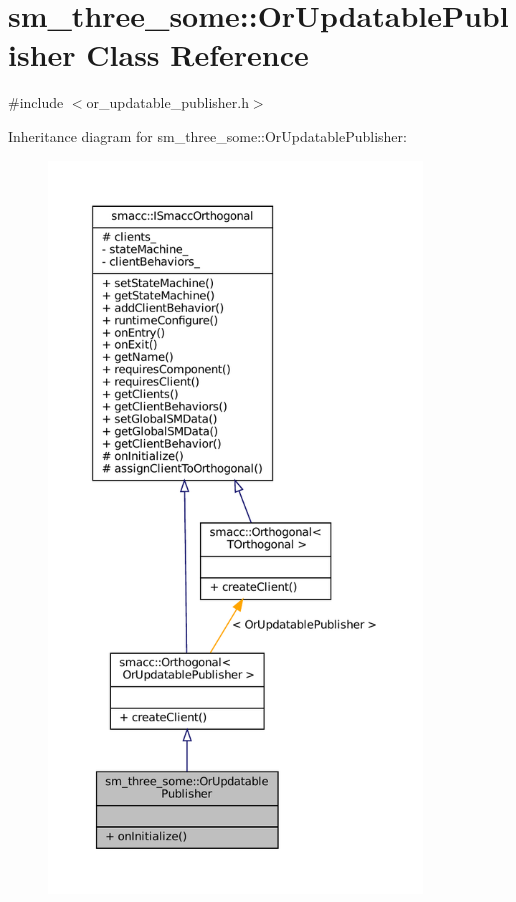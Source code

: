 \hypertarget{classsm__three__some_1_1OrUpdatablePublisher}{}\section{sm\+\_\+three\+\_\+some\+:\+:Or\+Updatable\+Publisher Class Reference}
\label{classsm__three__some_1_1OrUpdatablePublisher}


{\ttfamily \#include $<$or\+\_\+updatable\+\_\+publisher.\+h$>$}



Inheritance diagram for sm\+\_\+three\+\_\+some\+:\+:Or\+Updatable\+Publisher\+:
\nopagebreak
\begin{figure}[H]
\begin{center}
\leavevmode
\includegraphics[height=550pt]{classsm__three__some_1_1OrUpdatablePublisher__inherit__graph}
\end{center}
\end{figure}



